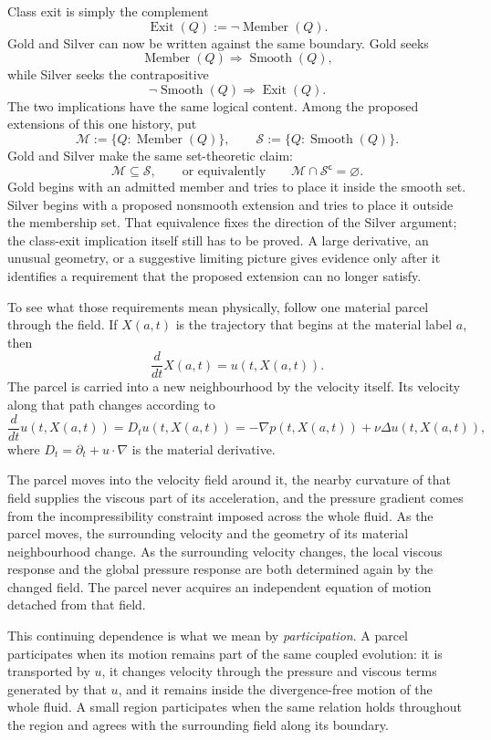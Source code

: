 Class exit is simply the complement
\[
  \operatorname{Exit}(Q)
  :=
  \neg\operatorname{Member}(Q).
\]
Gold and Silver can now be written against the same boundary.
Gold seeks
\[
  \operatorname{Member}(Q)
  \Longrightarrow
  \operatorname{Smooth}(Q),
\]
while Silver seeks the contrapositive
\[
  \neg\operatorname{Smooth}(Q)
  \Longrightarrow
  \operatorname{Exit}(Q).
\]
The two implications have the same logical content.
Among the proposed extensions of this one history, put
\[
  \mathcal M
  :=
  \{Q:\operatorname{Member}(Q)\},
  \qquad
  \mathcal S
  :=
  \{Q:\operatorname{Smooth}(Q)\}.
\]
Gold and Silver make the same set-theoretic claim:
\[
  \mathcal M\subseteq\mathcal S,
  \qquad\text{or equivalently}\qquad
  \mathcal M\cap\mathcal S^{\mathsf c}=\varnothing.
\]
Gold begins with an admitted member and tries to place it inside the smooth set.
Silver begins with a proposed nonsmooth extension and tries to place it outside the membership set.
That equivalence fixes the direction of the Silver argument; the class-exit implication itself still has to be proved.
A large derivative, an unusual geometry, or a suggestive limiting picture gives evidence only after it identifies a requirement that the proposed extension can no longer satisfy.


To see what those requirements mean physically, follow one material parcel through the field.
If \(X(a,t)\) is the trajectory that begins at the material label \(a\), then
\[
  \frac{d}{dt}X(a,t)=u(t,X(a,t)).
\]
The parcel is carried into a new neighbourhood by the velocity itself.
Its velocity along that path changes according to
\[
  \frac{d}{dt}u(t,X(a,t))
  =
  D_tu(t,X(a,t))
  =
  -\nabla p(t,X(a,t))
  +\nu\Delta u(t,X(a,t)),
\]
where \(D_t=\partial_t+u\cdot\nabla\) is the material derivative.

The parcel moves into the velocity field around it, the nearby curvature of that field supplies the viscous part of its acceleration, and the pressure gradient comes from the incompressibility constraint imposed across the whole fluid.
As the parcel moves, the surrounding velocity and the geometry of its material neighbourhood change.
As the surrounding velocity changes, the local viscous response and the global pressure response are both determined again by the changed field.
The parcel never acquires an independent equation of motion detached from that field.

This continuing dependence is what we mean by \emph{participation}.
A parcel participates when its motion remains part of the same coupled evolution: it is transported by \(u\), it changes velocity through the pressure and viscous terms generated by that \(u\), and it remains inside the divergence-free motion of the whole fluid.
A small region participates when the same relation holds throughout the region and agrees with the surrounding field along its boundary.

